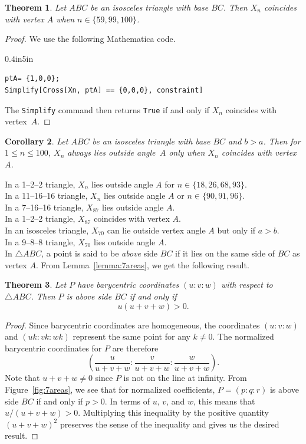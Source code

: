 \documentclass[12pt,a4paper]{amsart}
\newtheorem{theorem}{Theorem} [section]
\newtheorem{corollary}[theorem]{Corollary}
\begin{document}
\begin{theorem}
Let $ABC$ be an isosceles triangle with base $BC$.
Then $X_n$ coincides with vertex $A$ when $n\in \{59, 99, 100\}$.
\end{theorem}

\begin{proof}
We use the following Mathematica code.

\begin{code}{0.4in}{5in}
\begin{verbatim}
ptA= {1,0,0};
Simplify[Cross[Xn, ptA] == {0,0,0}, constraint]
\end{verbatim}
\end{code}

The \texttt{Simplify} command then returns \texttt{True} if and only if $X_n$ coincides with vertex~$A$.
\end{proof}

\begin{corollary}
Let $ABC$ be an isosceles triangle with base $BC$ and $b>a$.
Then for $1\leq n\leq 100$, $X_n$ always lies outside angle~$A$ only when
$X_n$ coincides with vertex~$A$.
\end{corollary}

In a 1--2--2 triangle, $X_n$ lies outside angle $A$ for $n\in\{18,26,68,93\}$.\\
In a 11--16--16 triangle, $X_n$ lies outside angle $A$ or $n\in\{90,91,96\}$.\\
In a 7--16--16 triangle, $X_{87}$ lies outside angle $A$.\\
In a 1--2--2 triangle, $X_{87}$ coincides with vertex $A$.\\

In an isosceles triangle, $X_{70}$ can lie outside vertex angle $A$ but only if $a>b$.\\
In a 9--8--8 triangle, $X_{70}$ lies outside angle $A$.\\

In $\triangle ABC$, a point is said to be \emph{above} side $BC$ if it
lies on the same side of $BC$ as vertex $A$.
From Lemma~\ref{lemma:7areas}, we get the following result.

\begin{theorem}
\label{thm:above}
Let $P$ have barycentric coordinates $(u:v:w)$ with respect to $\triangle ABC$.
Then $P$ is above side $BC$ if and only if
$$u(u+v+w)>0.$$
\end{theorem}

\begin{proof}
Since barycentric coordinates are homogeneous, the coordinates $(u:v:w)$ and $(uk:vk:wk)$
represent the same point for any $k\neq 0$.
The normalized barycentric coordinates for $P$ are therefore
$$\left(\frac{u}{u+v+w}:\frac{v}{u+v+w}:\frac{w}{u+v+w}\right).$$
Note that $u+v+w\neq 0$ since $P$ is not on the line at infinity.
From Figure~\ref{fig:7areas}, we see that for normalized coefficients, $P=(p:q:r)$ is above side $BC$
if and only if $p>0$.
In terms of $u$, $v$, and $w$, this means that
$u/(u+v+w)>0$.
Multiplying this inequality by the positive quantity $(u+v+w)^2$ preserves
the sense of the inequality and gives us the desired result.
\end{proof}
\end{document}
